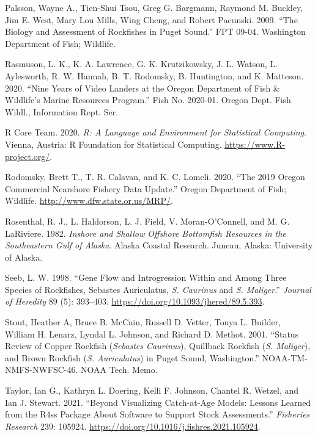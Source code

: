 \documentclass[11pt,
  english,
  a4paper,
]{article}
\begin{document}
\leavevmode\hypertarget{ref-Palssonetal_2009}{}%
Palsson, Wayne A., Tien-Shui Tsou, Greg G. Bargmann, Raymond M. Buckley, Jim E. West, Mary Lou Mills, Wing Cheng, and Robert Pacunski. 2009. ``The Biology and Assessment of Rockfishes in Puget Sound.'' FPT 09-04. Washington Department of Fish; Wildlife.

\leavevmode\hypertarget{ref-rasmuson_lander_2020}{}%
Rasmuson, L. K., K. A. Lawrence, G. K. Krutzikowsky, J. L. Watson, L. Aylesworth, R. W. Hannah, B. T. Rodomsky, B. Huntington, and K. Matteson. 2020. ``Nine Years of Video Landers at the Oregon Department of Fish \& Wildlife's Marine Resources Program.'' Fish No. 2020-01. Oregon Dept. Fish Wildl., Information Rept. Ser.

\leavevmode\hypertarget{ref-R_2020}{}%
R Core Team. 2020. \emph{R: A Language and Environment for Statistical Computing}. Vienna, Austria: R Foundation for Statistical Computing. \url{https://www.R-project.org/}.

\leavevmode\hypertarget{ref-rodomsky_2019_2020}{}%
Rodomsky, Brett T., T. R. Calavan, and K. C. Lomeli. 2020. ``The 2019 Oregon Commercial Nearshore Fishery Data Update.'' Oregon Department of Fish; Wildlife. \url{http://www.dfw.state.or.us/MRP/}.

\leavevmode\hypertarget{ref-Rosenthaletal_maturity_1982}{}%
Rosenthal, R. J., L. Haldorson, L. J. Field, V. Moran-O'Connell, and M. G. LaRiviere. 1982. \emph{Inshore and Shallow Offshore Bottomfish Resources in the Southeastern Gulf of Alaska}. Alaska Coastal Research. Juneau, Alaska: University of Alaska.

\leavevmode\hypertarget{ref-seeb_gene_1998}{}%
Seeb, L. W. 1998. ``Gene Flow and Introgression Within and Among Three Species of Rockfishes, Sebastes Auriculatus, \emph{S. Caurinus} and \emph{S. Maliger}.'' \emph{Journal of Heredity} 89 (5): 393--403. \url{https://doi.org/10.1093/jhered/89.5.393}.

\leavevmode\hypertarget{ref-Stoutetal_DPS_2001}{}%
Stout, Heather A, Bruce B. McCain, Russell D. Vetter, Tonya L. Builder, William H. Lenarz, Lyndal L. Johnson, and Richard D. Methot. 2001. ``Status Review of Copper Rockfish (\emph{Sebastes Caurinus}), Quillback Rockfish (\emph{S. Maliger}), and Brown Rockfish (\emph{S. Auriculatus}) in Puget Sound, Washington.'' NOAA-TM-NMFS-NWFSC-46. NOAA Tech. Memo.

\leavevmode\hypertarget{ref-r4ss_2021}{}%
Taylor, Ian G., Kathryn L. Doering, Kelli F. Johnson, Chantel R. Wetzel, and Ian J. Stewart. 2021. ``Beyond Visualizing Catch-at-Age Models: Lessons Learned from the R4ss Package About Software to Support Stock Assessments.'' \emph{Fisheries Research} 239: 105924. \url{https://doi.org/10.1016/j.fishres.2021.105924}.
\end{document}

